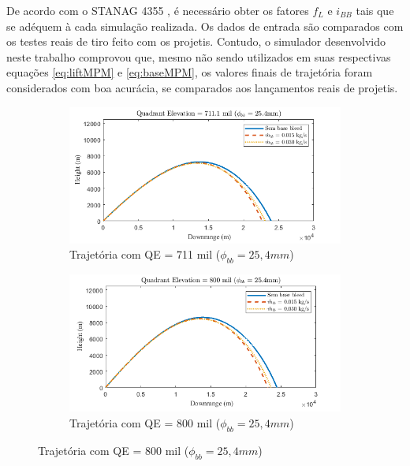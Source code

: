 De acordo com o STANAG 4355 \cite{stanag4355}, é necessário obter os fatores $f_{L}$ e $i_{BB}$ tais que se adéquem à cada simulação realizada. Os dados de entrada são comparados com os testes reais de tiro feito com os projetis. Contudo, o simulador desenvolvido neste trabalho comprovou que, mesmo não sendo utilizados em suas respectivas equações \ref{eq:liftMPM} e \ref{eq:baseMPM}, os valores finais de trajetória foram considerados com boa acurácia, se comparados aos lançamentos reais de projetis.

\begin{figure}[!ht]
	\centering
	\begin{subfigure}[b]{0.47\textwidth}
        \centering
        \includegraphics[width=\textwidth]{trajetoria_thallyo_wallace_basebleed-foto1.png}
        \caption{Trajetória com QE = 711 mil ($\phi_{bb} = 25,4\unit{mm}$)}
        \label{fig:trajetoria-711mil-1pol}
    \end{subfigure}
    \hfill
    \begin{subfigure}[b]{0.47\textwidth}
        \centering
        \includegraphics[width=\textwidth]{trajetoria_thallyo_wallace_basebleed-foto2.png}
        \caption{Trajetória com QE = 800 mil ($\phi_{bb} = 25,4\unit{mm}$)}
        \label{fig:trajetoria-800mil-1pol}

\end{subfigure}
\end{figure}
